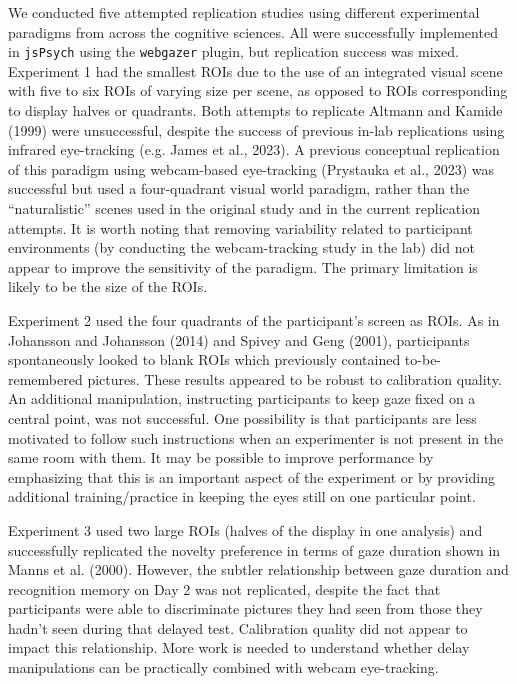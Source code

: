 \documentclass[
  man,floatsintext]{apa6}
\begin{document}
We conducted five attempted replication studies using different experimental paradigms from across the cognitive sciences. All were successfully implemented in \texttt{jsPsych} using the \texttt{webgazer} plugin, but replication success was mixed. Experiment 1 had the smallest ROIs due to the use of an integrated visual scene with five to six ROIs of varying size per scene, as opposed to ROIs corresponding to display halves or quadrants. Both attempts to replicate Altmann and Kamide (1999) were unsuccessful, despite the success of previous in-lab replications using infrared eye-tracking (e.g. James et al., 2023). A previous conceptual replication of this paradigm using webcam-based eye-tracking (Prystauka et al., 2023) was successful but used a four-quadrant visual world paradigm, rather than the ``naturalistic'' scenes used in the original study and in the current replication attempts. It is worth noting that removing variability related to participant environments (by conducting the webcam-tracking study in the lab) did not appear to improve the sensitivity of the paradigm. The primary limitation is likely to be the size of the ROIs.

Experiment 2 used the four quadrants of the participant's screen as ROIs. As in Johansson and Johansson (2014) and Spivey and Geng (2001), participants spontaneously looked to blank ROIs which previously contained to-be-remembered pictures. These results appeared to be robust to calibration quality. An additional manipulation, instructing participants to keep gaze fixed on a central point, was not successful. One possibility is that participants are less motivated to follow such instructions when an experimenter is not present in the same room with them. It may be possible to improve performance by emphasizing that this is an important aspect of the experiment or by providing additional training/practice in keeping the eyes still on one particular point.

Experiment 3 used two large ROIs (halves of the display in one analysis) and successfully replicated the novelty preference in terms of gaze duration shown in Manns et al. (2000). However, the subtler relationship between gaze duration and recognition memory on Day 2 was not replicated, despite the fact that participants were able to discriminate pictures they had seen from those they hadn't seen during that delayed test. Calibration quality did not appear to impact this relationship. More work is needed to understand whether delay manipulations can be practically combined with webcam eye-tracking.
\end{document}
